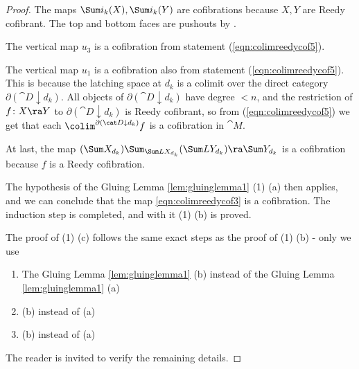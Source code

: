\begin{proof}
The maps $\Sum i_k(X), \Sum i_k(Y)$ are cofibrations because $X, Y$ are Reedy cofibrant. The top and bottom faces are pushouts by . 

The vertical map $u_3$ is a cofibration from statement (\ref{eqn:colimreedycof5}). 

The vertical map $u_1$ is a cofibration also from statement (\ref{eqn:colimreedycof5}). This is because the latching space at $d_k$ is a colimit over the direct category $\partial ({\cat D} \downarrow d_k)$. All objects of $\partial ({\cat D} \downarrow d_k)$ have degree $< n$, and the restriction of $f \colon X \ra Y$ to $\partial ({\cat D} \downarrow d_k)$ is Reedy cofibrant, so from (\ref{eqn:colimreedycof5}) we get that each $\colim^{\partial ({\cat D} \downarrow d_k)} f$ is a cofibration in ${\cat M}$.

At last, the map $(\Sum X_{d_k}) \Sum_{\Sum LX_{d_k}} (\Sum LY_{d_k}) \ra \Sum Y_{d_k}$ is a cofibration because $f$ is a Reedy cofibration.

The hypothesis of the Gluing Lemma \ref{lem:gluinglemma1} (1) (a) then applies, and we can conclude that the map \eqref{eqn:colimreedycof3} is a cofibration. The induction step is completed, and with it (1) (b) is proved.

The proof of (1) (c) follows the same exact steps as the proof of (1) (b) - only we use 
\begin{enumerate}
\item[-]
The Gluing Lemma \ref{lem:gluinglemma1} (b) instead of the Gluing Lemma \ref{lem:gluinglemma1} (a)
\item[-]
 (b) instead of (a)
\item[-]
 (b) instead of (a)
\end{enumerate}
The reader is invited to verify the remaining details.
\end{proof}

